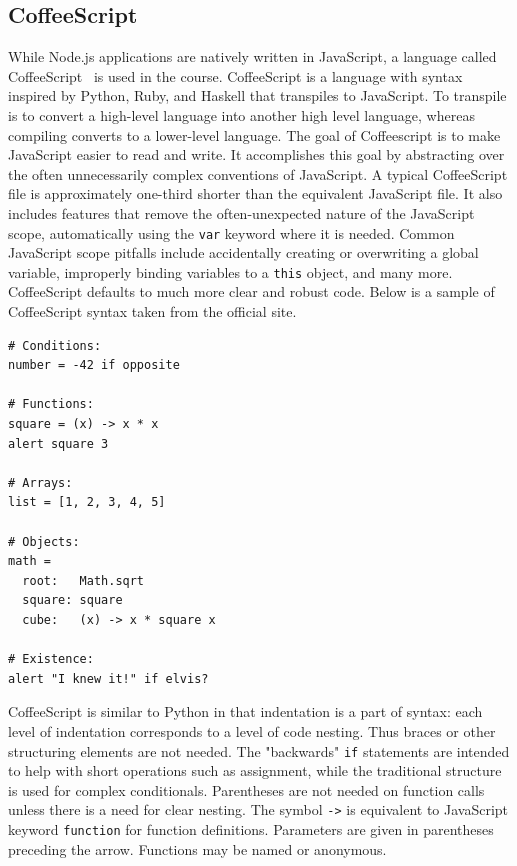 \documentclass[12pt]{article}
\newcommand{\code}[1]{{\texttt {#1}}}
\begin{document}
\subsection{CoffeeScript}\label{sec:coffee}
While Node.js applications are natively written in JavaScript, a language called CoffeeScript~\cite{CoffeeScript} is used in the course. 
CoffeeScript is a language with syntax inspired by Python, Ruby, and Haskell that transpiles to JavaScript. 
To transpile is to convert a high-level language into another high level language, whereas compiling converts to a lower-level language. 
The goal of Coffeescript is to make JavaScript easier to read and write. 
It accomplishes this goal by abstracting over the often unnecessarily complex conventions of JavaScript. 
A typical CoffeeScript file is approximately one-third shorter than the equivalent JavaScript file. 
It also includes features that remove the often-unexpected nature of the JavaScript scope, automatically using the \code{var} keyword where it is needed. 
Common JavaScript scope pitfalls include accidentally creating or overwriting a global variable, improperly binding variables to a \code{this} object, and many more. 
CoffeeScript defaults to much more clear and robust code. 
Below is a sample of CoffeeScript syntax taken from the official site.
\begin{verbatim}
# Conditions:
number = -42 if opposite

# Functions:
square = (x) -> x * x
alert square 3

# Arrays:
list = [1, 2, 3, 4, 5]

# Objects:
math =
  root:   Math.sqrt
  square: square
  cube:   (x) -> x * square x

# Existence:
alert "I knew it!" if elvis?

\end{verbatim}
CoffeeScript is similar to Python in that indentation is a part of syntax: each level of indentation corresponds to a level of code nesting. 
Thus braces or other structuring elements are not needed.
The "backwards" \code{if} statements are intended to help with short operations such as assignment, while the traditional structure is used for complex conditionals. 
Parentheses are not needed on function calls unless there is a need for clear nesting. 
The symbol \code{->} is equivalent to JavaScript keyword \code{function} for function definitions. 
Parameters are given in parentheses preceding the arrow. 
Functions may be named or anonymous. 
\end{document}
